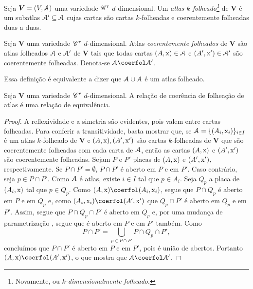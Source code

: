 \begin{defi}
Seja $\bm V = (V,\mathcal{A})$ uma variedade $\mathscr{C}^r$ $d$-dimensional. Um \emph{atlas $k$-folheado\footnote{Novamente, ou \emph{$k$-dimensionalmente folheado}.}} de $\bm V$ é um subatlas $\mathcal{A}' \subseteq \mathcal{A}$ cujas cartas são cartas $k$-folheadas e coerentemente folheadas duas a duas.
\end{defi}

\begin{defi}
Seja $\bm V$ uma variedade $\mathscr{C}^r$ $d$-dimensional. Atlas \emph{coerentemente folheados} de $\bm V$ são atlas folheados $\mathcal{A}$ e $\mathcal{A}'$ de $\bm V$ tais que todas cartas $(A,\mathrm{x}) \in \mathcal{A}$ e $(A',\mathrm{x}') \in \mathcal{A}'$ são coerentemente folheadas. Denota-se $\atlas \coerfol \atlas'$.
\end{defi}

Essa definição é equivalente a dizer que $\mathcal{A} \cup \mathcal{A}$ é um atlas folheado.

\begin{prop}
Seja $\bm V$ uma variedade $\mathscr{C}^r$ $d$-dimensional. A relação de coerência de folheação de atlas é uma relação de equivalência.
\end{prop}
\begin{proof}
A reflexividade e a simetria são evidentes, pois valem entre cartas folheadas. Para conferir a transitividade, basta mostrar que, se $\mathcal{A} = \{(A_i,\mathrm{x}_i)\}_{i \in I}$ é um atlas $k$-folheado de $\bm V$ e $(A,\mathrm{x}), (A',\mathrm{x}')$ são cartas $k$-folheadas de $\bm V$ que são coerentemente folheadas com cada carta de $\mathcal{A}$, então as cartas $(A,\mathrm{x})$ e $(A',\mathrm{x}')$ são coerentemente folheadas. Sejam $P$ e $P'$ placas de $(A,\mathrm{x})$ e $(A',\mathrm{x}')$, respectivamente. Se $P \cap P' = \emptyset$, $P \cap P'$ é aberto em $P$ e em $P'$. Caso contrário, seja $p \in P \cap P'$. Como $\mathcal{A}$ é atlas, existe $i \in I$ tal que $p \in A_i$. Seja $Q_p$ a placa de $(A_i,\mathrm{x})$ tal que $p \in Q_p$. Como $(A,\x) \coerfol (A_i,\x_i)$, segue que $P \cap Q_p$ é aberto em $P$ e em $Q_p$ e, como $(A_i,\x_i) \coerfol (A',\x')$ que $Q_p \cap P'$ é aberto em $Q_p$ e em $P'$. Assim, segue que $P \cap Q_p \cap P'$ é aberto em $Q_p$ e, por uma mudança de parametrização%
, segue que é aberto em $P$ e em $P'$ também. Como
	\begin{equation*}
	P \cap P' = \bigcup_{p \in P \cap P'} P \cap Q_p \cap P',
	\end{equation*}
concluímos que $P \cap P'$ é aberto em $P$ e em $P'$, pois é união de abertos. Portanto $(A,\x) \coerfol (A',\x')$, o que mostra que $\atlas \coerfol \atlas'$.
\end{proof}

